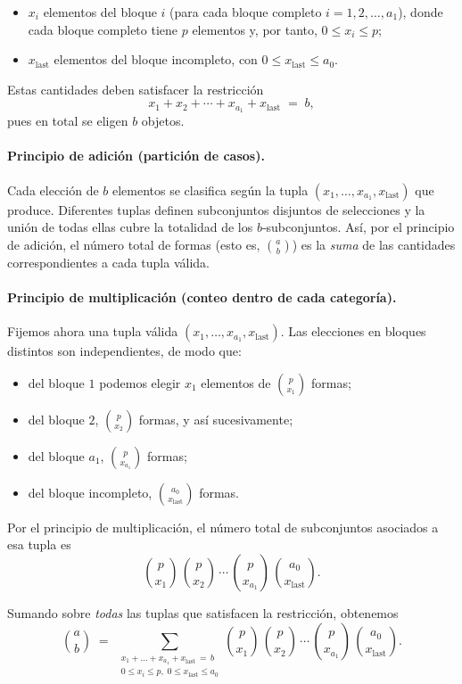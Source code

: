 \documentclass{article}
\begin{document}
\begin{itemize}
  \item $x_i$ elementos del bloque $i$ (para cada bloque completo $i = 1,2,\dots,a_1$), donde cada bloque completo tiene $p$ elementos y, por tanto, $0 \le x_i \le p$;
  \item $x_{\text{last}}$ elementos del bloque incompleto, con $0 \le x_{\text{last}} \le a_0$.
\end{itemize}

Estas cantidades deben satisfacer la restricción
\[
  x_1 + x_2 + \cdots + x_{a_1} + x_{\text{last}} \;=\; b,
\]
pues en total se eligen $b$ objetos.

\paragraph{Principio de adición (partición de casos).}
Cada elección de $b$ elementos se clasifica según la tupla
$(x_1,\dots,x_{a_1},x_{\text{last}})$ que produce.  
Diferentes tuplas definen subconjuntos disjuntos de selecciones
y la unión de todas ellas cubre la totalidad de los $b$‑subconjuntos.
Así, por el principio de adición, el número total de formas (esto es, $\binom{a}{b}$) es la \emph{suma} de las cantidades correspondientes a cada tupla válida.

\paragraph{Principio de multiplicación (conteo dentro de cada categoría).}
Fijemos ahora una tupla válida $(x_1,\dots,x_{a_1},x_{\text{last}})$.
Las elecciones en bloques distintos son independientes, de modo que:

\begin{itemize}
  \item del bloque $1$ podemos elegir $x_1$ elementos de $\binom{p}{x_1}$ formas;
  \item del bloque $2$, $\binom{p}{x_2}$ formas, y así sucesivamente;
  \item del bloque $a_1$, $\binom{p}{x_{a_1}}$ formas;
  \item del bloque incompleto, $\binom{a_0}{x_{\text{last}}}$ formas.
\end{itemize}

Por el principio de multiplicación, el número total de subconjuntos
asociados a esa tupla es
\[
  \binom{p}{x_1}\,\binom{p}{x_2}\,\cdots\,
  \binom{p}{x_{a_1}}\,
  \binom{a_0}{x_{\text{last}}}.
\]

\noindent Sumando sobre \emph{todas} las tuplas que satisfacen la restricción, obtenemos
\[
  \binom{a}{b}
  \;=\;
  \sum_{\substack{
      x_1+\dots+x_{a_1}+x_{\text{last}}\,=\,b\\
      0 \le x_i \le p,\;
      0 \le x_{\text{last}} \le a_0
  }}
  \binom{p}{x_1}\,
  \binom{p}{x_2}\,\cdots\,
  \binom{p}{x_{a_1}}\,
  \binom{a_0}{x_{\text{last}}}.
\]
\end{document}
